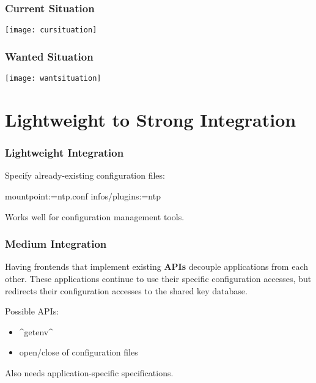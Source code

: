 \begin{frame}
	\frametitle{Current Situation}
	\texttt{[image: cursituation]}
\end{frame}

\begin{frame}
	\frametitle{Wanted Situation}
	\texttt{[image: wantsituation]}
\end{frame}


\section{Lightweight to Strong Integration}

\begin{frame}[fragile]
	\frametitle{Lightweight Integration}

	Specify already-existing configuration files:
	\begin{code}[language=Cpp,gobble=4,showspaces=no]
	[ntp]
	  mountpoint:=ntp.conf
	  infos/plugins:=ntp
	\end{code}

	\vspace{1cm}
	Works well for configuration management tools.
\end{frame}

\begin{frame}[fragile]
	\frametitle{Medium Integration}

	Having frontends that implement existing \textbf{APIs} decouple applications from each other.
	These applications continue to use their specific configuration accesses, but \elektra{} redirects their configuration accesses to the shared key database.

	Possible APIs:
	\begin{itemize}[<+-| alert@+>]
	\item ^getenv^
	\item open/close of configuration files
	\end{itemize}

	\pause[\thebeamerpauses]
	\vspace{1cm}

	Also needs application-specific specifications.
\end{frame}

